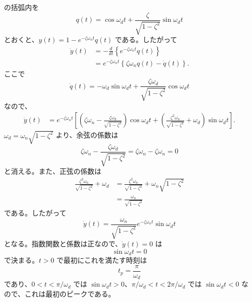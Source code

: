 \begin{derivation}
 の括弧内を
\begin{equation}
  q(t)=\cos\omega_d t+
  \frac{\zeta}{\sqrt{1-\zeta^2}}\sin\omega_d t
\end{equation}
とおくと、$y(t)=1-e^{-\zeta\omega_n t}q(t)$ である。したがって
\begin{align}
  \dot{y}(t)
  &=-\frac{d}{dt}\left\{e^{-\zeta\omega_n t}q(t)\right\}\\
  &=e^{-\zeta\omega_n t}
  \left\{\zeta\omega_n q(t)-\dot{q}(t)\right\}.
\end{align}
ここで
\begin{equation}
  \dot{q}(t)=
  -\omega_d\sin\omega_d t+
  \frac{\zeta\omega_d}{\sqrt{1-\zeta^2}}\cos\omega_d t
\end{equation}
なので、
\begin{align}
  \dot{y}(t)
  &=e^{-\zeta\omega_n t}
  \left[
  \left(\zeta\omega_n-
  \frac{\zeta\omega_d}{\sqrt{1-\zeta^2}}\right)\cos\omega_d t
  +\left(
  \frac{\zeta^2\omega_n}{\sqrt{1-\zeta^2}}+\omega_d
  \right)\sin\omega_d t
  \right].
\end{align}
$\omega_d=\omega_n\sqrt{1-\zeta^2}$ より、余弦の係数は
\begin{equation}
  \zeta\omega_n-
  \frac{\zeta\omega_d}{\sqrt{1-\zeta^2}}
  =\zeta\omega_n-\zeta\omega_n=0
\end{equation}
と消える。また、正弦の係数は
\begin{align}
  \frac{\zeta^2\omega_n}{\sqrt{1-\zeta^2}}+\omega_d
  &=
  \frac{\zeta^2\omega_n}{\sqrt{1-\zeta^2}}
  +\omega_n\sqrt{1-\zeta^2}\\
  &=\frac{\omega_n}{\sqrt{1-\zeta^2}}
\end{align}
である。したがって
\begin{equation}
  \dot{y}(t)=
  \frac{\omega_n}{\sqrt{1-\zeta^2}}
  e^{-\zeta\omega_n t}\sin\omega_d t
\end{equation}
となる。指数関数と係数は正なので、$\dot{y}(t)=0$ は
\begin{equation}
  \sin\omega_d t=0
\end{equation}
で決まる。$t>0$ で最初にこれを満たす時刻は
\begin{equation}
  t_p=\frac{\pi}{\omega_d}
\end{equation}
であり、$0<t<\pi/\omega_d$ では $\sin\omega_d t>0$、$\pi/\omega_d<t<2\pi/\omega_d$ では $\sin\omega_d t<0$ なので、これは最初のピークである。


\end{derivation}
